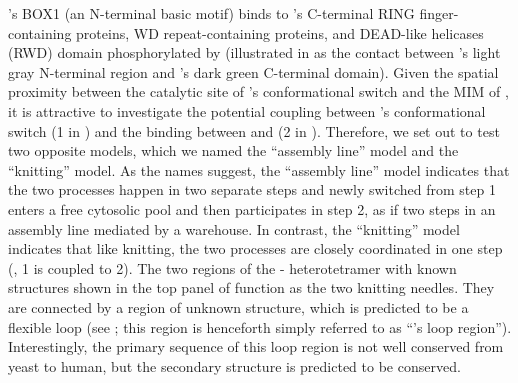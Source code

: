 's BOX1 (an N-terminal basic motif) binds to 's C-terminal RING finger-containing proteins, WD repeat-containing proteins, and DEAD-like helicases (RWD) domain phosphorylated by  \cite{Ji2017eLife, BUB1-CDC20-MAD1} (illustrated in  as the contact between 's light gray N-terminal region and 's dark green C-terminal domain). Given the spatial proximity between the catalytic site of 's conformational switch and the MIM of , it is attractive to investigate the potential coupling between 's conformational switch (\textcircled{\small{1}} in ) and the binding between  and  (\textcircled{\small{2}} in ). Therefore, we set out to test two opposite models, which we named the ``assembly line'' model and the ``knitting'' model. As the names suggest, the ``assembly line'' model indicates that the two processes happen in two separate steps and newly switched  from step \textcircled{\small{1}} enters a free cytosolic pool and then participates in step \textcircled{\small{2}}, as if two steps in an assembly line mediated by a warehouse. In contrast, the ``knitting'' model indicates that like knitting, the two processes are closely coordinated in one step  (, \textcircled{\small{1}} is coupled to \textcircled{\small{2}}). The two regions of the - heterotetramer with known structures shown in the top panel of  function as the two knitting needles. They are connected by a region of unknown structure, which is predicted to be a flexible loop (see ; this region is henceforth simply referred to as ``'s loop region''). Interestingly, the primary sequence of this loop region is not well conserved from yeast to human, but the secondary structure is predicted to be conserved.

